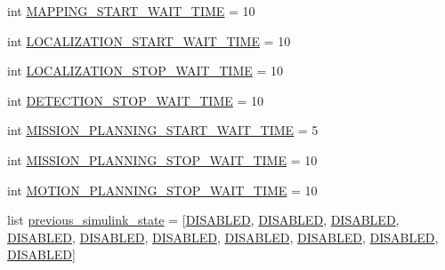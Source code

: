 \begin{DoxyCompactItemize}
\item 
int \hyperlink{namespacerp__manager_ae777617cb6dd55d3254cf75c4cdfbfd5}{M\+A\+P\+P\+I\+N\+G\+\_\+\+S\+T\+A\+R\+T\+\_\+\+W\+A\+I\+T\+\_\+\+T\+I\+ME} = 10
\item 
int \hyperlink{namespacerp__manager_adc40cec510857cc5bb8413424beac186}{L\+O\+C\+A\+L\+I\+Z\+A\+T\+I\+O\+N\+\_\+\+S\+T\+A\+R\+T\+\_\+\+W\+A\+I\+T\+\_\+\+T\+I\+ME} = 10
\item 
int \hyperlink{namespacerp__manager_a38b9eb0e03b90a19ad2a9f3cbac93eba}{L\+O\+C\+A\+L\+I\+Z\+A\+T\+I\+O\+N\+\_\+\+S\+T\+O\+P\+\_\+\+W\+A\+I\+T\+\_\+\+T\+I\+ME} = 10
\item 
int \hyperlink{namespacerp__manager_a2a1de6661f1541719bab9d3d2e7661a1}{D\+E\+T\+E\+C\+T\+I\+O\+N\+\_\+\+S\+T\+O\+P\+\_\+\+W\+A\+I\+T\+\_\+\+T\+I\+ME} = 10
\item 
int \hyperlink{namespacerp__manager_a03431ff00baee9003b9897bcfb5e05ca}{M\+I\+S\+S\+I\+O\+N\+\_\+\+P\+L\+A\+N\+N\+I\+N\+G\+\_\+\+S\+T\+A\+R\+T\+\_\+\+W\+A\+I\+T\+\_\+\+T\+I\+ME} = 5
\item 
int \hyperlink{namespacerp__manager_a4aedafb6426407e86b472aba3711903d}{M\+I\+S\+S\+I\+O\+N\+\_\+\+P\+L\+A\+N\+N\+I\+N\+G\+\_\+\+S\+T\+O\+P\+\_\+\+W\+A\+I\+T\+\_\+\+T\+I\+ME} = 10
\item 
int \hyperlink{namespacerp__manager_af8fe99e675b5d549f9b6b93de26c41f5}{M\+O\+T\+I\+O\+N\+\_\+\+P\+L\+A\+N\+N\+I\+N\+G\+\_\+\+S\+T\+O\+P\+\_\+\+W\+A\+I\+T\+\_\+\+T\+I\+ME} = 10
\item 
list \hyperlink{namespacerp__manager_a5071f53ee23fdca3994006206cbcf2ee}{previous\+\_\+simulink\+\_\+state} = \mbox{[}\hyperlink{namespacerp__manager_af85e17f72f768eba5168eba56041bd69}{D\+I\+S\+A\+B\+L\+ED}, \hyperlink{namespacerp__manager_af85e17f72f768eba5168eba56041bd69}{D\+I\+S\+A\+B\+L\+ED}, \hyperlink{namespacerp__manager_af85e17f72f768eba5168eba56041bd69}{D\+I\+S\+A\+B\+L\+ED}, \hyperlink{namespacerp__manager_af85e17f72f768eba5168eba56041bd69}{D\+I\+S\+A\+B\+L\+ED}, \hyperlink{namespacerp__manager_af85e17f72f768eba5168eba56041bd69}{D\+I\+S\+A\+B\+L\+ED}, \hyperlink{namespacerp__manager_af85e17f72f768eba5168eba56041bd69}{D\+I\+S\+A\+B\+L\+ED}, \hyperlink{namespacerp__manager_af85e17f72f768eba5168eba56041bd69}{D\+I\+S\+A\+B\+L\+ED}, \hyperlink{namespacerp__manager_af85e17f72f768eba5168eba56041bd69}{D\+I\+S\+A\+B\+L\+ED}, \hyperlink{namespacerp__manager_af85e17f72f768eba5168eba56041bd69}{D\+I\+S\+A\+B\+L\+ED}, \hyperlink{namespacerp__manager_af85e17f72f768eba5168eba56041bd69}{D\+I\+S\+A\+B\+L\+ED}\mbox{]}
\item 

\end{DoxyCompactItemize}
